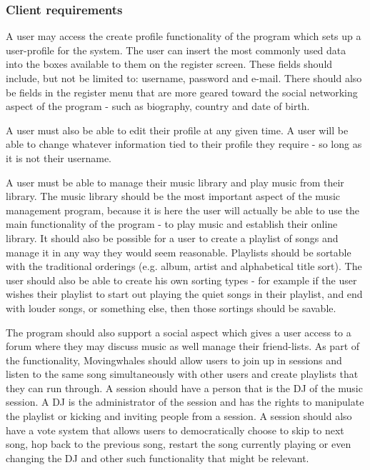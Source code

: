 \subsubsection{Client requirements}

A user may access the create profile functionality of the program which sets 
up a user-profile for the system. The user can insert the most commonly used 
data into the boxes available to them on the register screen. These fields 
should include, but not be limited to: username, password and e-mail. 
There should also be fields in the register menu that are more geared toward 
the social networking aspect of the program - such as biography, 
country and date of birth. 

A user must also be able to edit their profile at any given time. A user will 
be able to change whatever information tied to their profile they require - 
so long as it is not their username. 

A user must be able to manage their music library and play music from their 
library. The music library should be the most important aspect of the music 
management program, because it is here the user will actually be able to use 
the main functionality of the program - to play music and establish their 
online library. It should also be possible for a user to create a playlist of 
songs and manage it in any way they would seem reasonable. Playlists should be 
sortable with the traditional orderings (e.g. album, artist and alphabetical 
title sort). The user should also be able to create his own sorting types - 
for example if the user wishes their playlist to start out playing the quiet 
songs in their playlist, and end with louder songs, or something else, 
then those sortings should be savable.

The program should also support a social aspect which gives a user access to a 
forum where they may discuss music as well manage their friend-lists. As part 
of the functionality, Movingwhales should allow users to join up in sessions 
and listen to the same song simultaneously with other users and create 
playlists that they can run through. A session should have a person that is 
the DJ of the music session. A DJ is the administrator of the session and has 
the rights to manipulate the playlist or kicking and inviting people from a 
session. A session should also have a vote system that allows users to 
democratically choose to skip to next song, hop back to the previous song, 
restart the song currently playing or even changing the DJ and other such 
functionality that might be relevant.